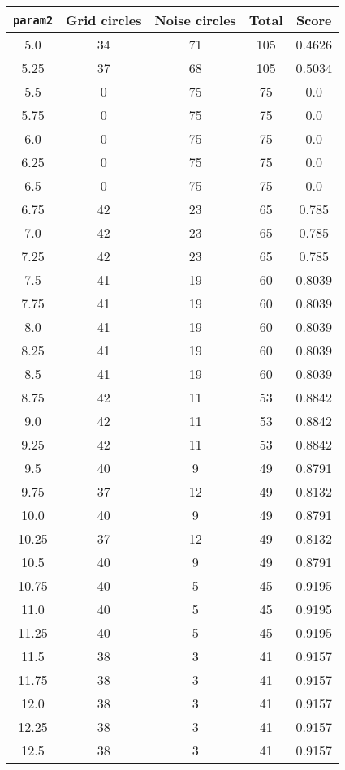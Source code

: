 \documentclass[letterpaper, 12pt]{article}
\begin{document}
\begin{longtable}{|c|c|c|c|c|}
\hline
\textbf{\texttt{param2}} & \textbf{Grid circles} & \textbf{Noise circles} & \textbf{Total} & \textbf{Score} \\
\hline
5.0 & 34 & 71 & 105 & 0.4626 \\
\hline
5.25 & 37 & 68 & 105 & 0.5034 \\
\hline
5.5 & 0 & 75 & 75 & 0.0 \\
\hline
5.75 & 0 & 75 & 75 & 0.0 \\
\hline
6.0 & 0 & 75 & 75 & 0.0 \\
\hline
6.25 & 0 & 75 & 75 & 0.0 \\
\hline
6.5 & 0 & 75 & 75 & 0.0 \\
\hline
6.75 & 42 & 23 & 65 & 0.785 \\
\hline
7.0 & 42 & 23 & 65 & 0.785 \\
\hline
7.25 & 42 & 23 & 65 & 0.785 \\
\hline
7.5 & 41 & 19 & 60 & 0.8039 \\
\hline
7.75 & 41 & 19 & 60 & 0.8039 \\
\hline
8.0 & 41 & 19 & 60 & 0.8039 \\
\hline
8.25 & 41 & 19 & 60 & 0.8039 \\
\hline
8.5 & 41 & 19 & 60 & 0.8039 \\
\hline
8.75 & 42 & 11 & 53 & 0.8842 \\
\hline
9.0 & 42 & 11 & 53 & 0.8842 \\
\hline
9.25 & 42 & 11 & 53 & 0.8842 \\
\hline
9.5 & 40 & 9 & 49 & 0.8791 \\
\hline
9.75 & 37 & 12 & 49 & 0.8132 \\
\hline
10.0 & 40 & 9 & 49 & 0.8791 \\
\hline
10.25 & 37 & 12 & 49 & 0.8132 \\
\hline
10.5 & 40 & 9 & 49 & 0.8791 \\
\hline
10.75 & 40 & 5 & 45 & 0.9195 \\
\hline
11.0 & 40 & 5 & 45 & 0.9195 \\
\hline
11.25 & 40 & 5 & 45 & 0.9195 \\
\hline
11.5 & 38 & 3 & 41 & 0.9157 \\
\hline
11.75 & 38 & 3 & 41 & 0.9157 \\
\hline
12.0 & 38 & 3 & 41 & 0.9157 \\
\hline
12.25 & 38 & 3 & 41 & 0.9157 \\
\hline
12.5 & 38 & 3 & 41 & 0.9157 \\

\end{longtable}
\end{document}
